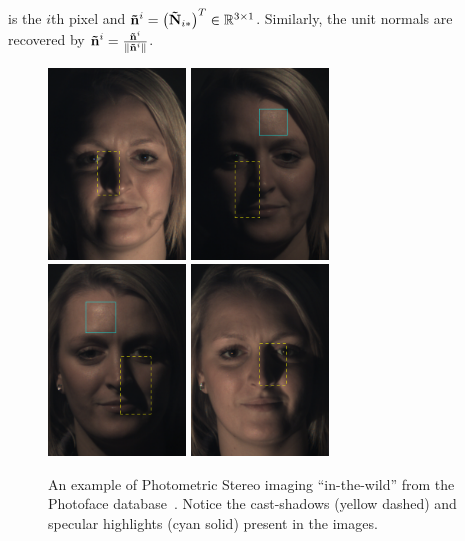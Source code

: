 is the $i$th pixel and
$\boldsymbol{\mathbf{\tilde{n}}}^i = {\left(\boldsymbol{\mathbf{\tilde{N}}}_{i\ast}\right)}^T \in \mathbb{R}^{3 \times 1}$.
Similarly, the unit normals are recovered by
$\boldsymbol{\mathbf{\tilde{n}}}^i = \frac{\boldsymbol{\mathbf{\tilde{n}}}^i}{\lVert{} \boldsymbol{\mathbf{\tilde{n}}}^i \rVert}$.
\begin{figure}[t]
	\centering
	\includegraphics[height=2in]{background/images/photoface0}
	\includegraphics[height=2in]{background/images/photoface1}
	\includegraphics[height=2in]{background/images/photoface2}
	\includegraphics[height=2in]{background/images/photoface3}
	\caption{An example of Photometric Stereo imaging ``in-the-wild'' from
	         the Photoface database~\cite{zafeiriou2013photoface}. 
	         Notice the cast-shadows (yellow dashed) and specular highlights
	         (cyan solid) present in the images.}
\label{fig:bg_ps_photoface}
\end{figure}

